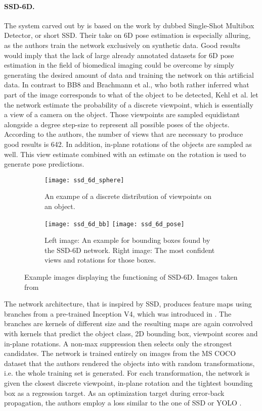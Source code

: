 \paragraph{SSD-6D.}

The system carved out by \cite{ssd-6d} is based on the work by \cite{ssd} dubbed Single-Shot Multibox Detector, or short SSD. Their take on 6D pose estimation is especially alluring, as the authors train the network exclusively on synthetic data. Good results would imply that the lack of large already annotated datasets for 6D pose estimation in the field of biomedical imaging could be overcome by simply generating the desired amount of data and training the network on this artificial data. 
\nnewline
In contrast to BB8 and Brachmann et al., who both rather inferred what part of the image corresponds to what of the object to be detected, Kehl et al. let the network estimate the probability of a discrete viewpoint, which is essentially a view of a camera on the object. Those viewpoints are sampled equidistant alongside a degree step-size to represent all possible poses of the objects. According to the authors, the number of views that are necessary to produce good results is 642. In addition, in-plane rotations of the objects are sampled as well. This view estimate combined with an estimate on the rotation is used to generate pose predictions. 
\nnewline
\begin{figure}[!tbp]
	\centering
	\begin{subfigure}[b]{0.3\textwidth}
		\centering
    	\texttt{[image: ssd\_6d\_sphere]}
    	\caption{An exampe of a discrete distribution of viewpoints on an object.}
	\end{subfigure}
	\hfill
	\begin{subfigure}[b]{0.6\textwidth}
		\centering
    	\texttt{[image: ssd\_6d\_bb]}
    	\texttt{[image: ssd\_6d\_pose]}
    	\caption{Left image: An example for bounding boxes found by the SSD-6D network. Right image: The most confident views and rotations for those boxes.}
	\end{subfigure}
	\caption{Example images displaying the functioning of SSD-6D. Images taken from \cite{ssd-6d}}
\end{figure}
The network architecture, that is inspired by SSD, produces feature maps using branches from a pre-trained Inception V4, which was introduced in \cite{inceptionv4}. The branches are kernels of different size and the resulting maps are again convolved with kernels that predict the object class, 2D bounding box, viewpoint scores and in-plane rotations. A non-max suppression then selects only the strongest candidates. The network is trained entirely on images from the MS COCO dataset \cite{mscoco} that the authors rendered the objects into with random transformations, i.e. the whole training set is generated. For each transformation, the network is given the closest discrete viewpoint, in-plane rotation and the tightest bounding box as a regression target. As an optimization target during error-back propagation, the authors employ a loss similar to the one of SSD \cite{ssd} or YOLO \cite{yolo}. 

